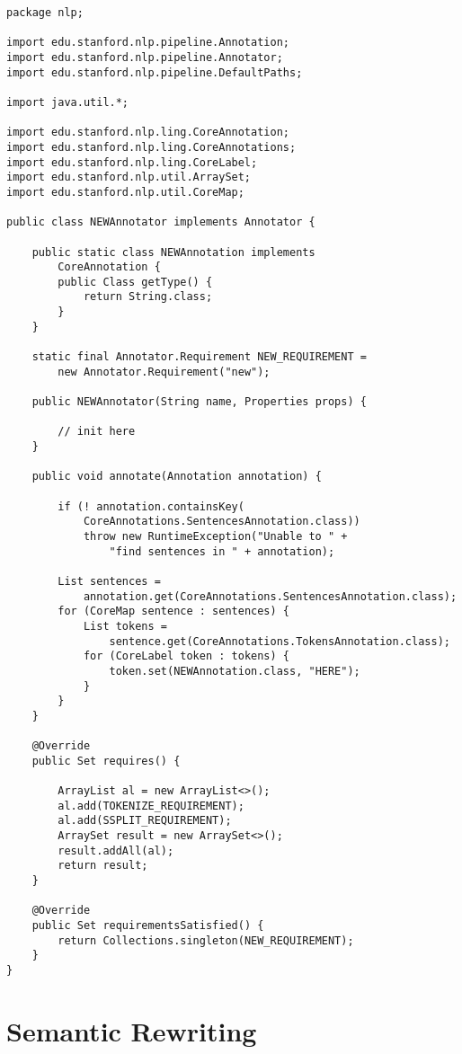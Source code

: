 \documentclass{book}
\begin{document}
\begin{lstlisting}[basicstyle=\ttfamily\small\bfseries]
package nlp;

import edu.stanford.nlp.pipeline.Annotation;
import edu.stanford.nlp.pipeline.Annotator;
import edu.stanford.nlp.pipeline.DefaultPaths;

import java.util.*;

import edu.stanford.nlp.ling.CoreAnnotation;
import edu.stanford.nlp.ling.CoreAnnotations;
import edu.stanford.nlp.ling.CoreLabel;
import edu.stanford.nlp.util.ArraySet;
import edu.stanford.nlp.util.CoreMap;

public class NEWAnnotator implements Annotator {

    public static class NEWAnnotation implements 
        CoreAnnotation {
        public Class getType() {
            return String.class;
        }
    }

    static final Annotator.Requirement NEW_REQUIREMENT = 
        new Annotator.Requirement("new");

    public NEWAnnotator(String name, Properties props) {

        // init here
    }

    public void annotate(Annotation annotation) {

        if (! annotation.containsKey(
            CoreAnnotations.SentencesAnnotation.class))
            throw new RuntimeException("Unable to " +
                "find sentences in " + annotation);

        List sentences = 
            annotation.get(CoreAnnotations.SentencesAnnotation.class);
        for (CoreMap sentence : sentences) {
            List tokens = 
                sentence.get(CoreAnnotations.TokensAnnotation.class);
            for (CoreLabel token : tokens) {
                token.set(NEWAnnotation.class, "HERE");
            }            
        }
    }

    @Override
    public Set requires() {

        ArrayList al = new ArrayList<>();
        al.add(TOKENIZE_REQUIREMENT);
        al.add(SSPLIT_REQUIREMENT);
        ArraySet result = new ArraySet<>();
        result.addAll(al);
        return result;
    }

    @Override
    public Set requirementsSatisfied() {
        return Collections.singleton(NEW_REQUIREMENT);
    }
}
\end{lstlisting}

\chapter{Semantic Rewriting}
\end{document}
